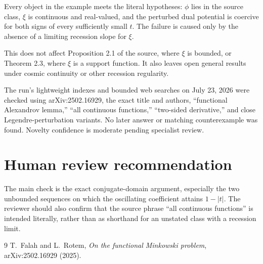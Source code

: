 \documentclass[11pt]{article}
\begin{document}
Every object in the example meets the literal hypotheses: $\phi$ lies in the
source class, $\xi$ is continuous and real-valued, and the perturbed dual
potential is coercive for both signs of every sufficiently small $t$.  The
failure is caused only by the absence of a limiting recession slope for
$\xi$.

This does not affect Proposition 2.1 of the source, where $\xi$ is bounded, or
Theorem 2.3, where $\xi$ is a support function.  It also leaves open general
results under cosmic continuity or other recession regularity.

The run's lightweight indexes and bounded web searches on July 23, 2026 were
checked using arXiv:2502.16929, the exact title and authors, ``functional
Alexandrov lemma,'' ``all continuous functions,'' ``two-sided derivative,''
and close Legendre-perturbation variants.  No later answer or matching
counterexample was found.  Novelty confidence is moderate pending specialist
review.

\section{Human review recommendation}

The main check is the exact conjugate-domain argument, especially the two
unbounded sequences on which the oscillating coefficient attains $1-|t|$.
The reviewer should also confirm that the source phrase ``all continuous
functions'' is intended literally, rather than as shorthand for an unstated
class with a recession limit.

\begin{thebibliography}{9}
T.~Falah and L.~Rotem,
\emph{On the functional Minkowski problem},
arXiv:2502.16929 (2025).
\end{thebibliography}
\end{document}
